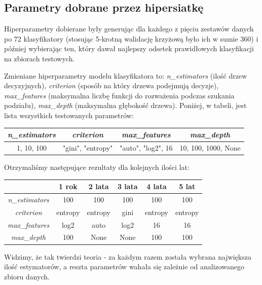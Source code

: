 \documentclass[11pt]{article}
\begin{document}
\subsection{Parametry dobrane przez hipersiatkę}
Hiperparametry dobierane były generując dla każdego z pięciu zestawów danych po 72 klasyfikatory (stosując 5-krotną walidację krzyżową było ich w sumie 360) i później wybierając ten, który dawał najlepszy odsetek prawidłowych klasyfikacji na zbiorach testowych.

Zmieniane hiperparametry modelu klasyfikatora to: \textsl{n\_estimators} (ilość drzew decyzyjnych), \textsl{criterion} (sposób na który drzewa podejmują decyzje), \textsl{max\_features} (maksymalna liczbę funkcji do rozważenia podczas szukania podziału), \textsl{max\_depth} (maksymalna głębokość drzewa). Poniżej, w tabeli, jest lista wszystkich testowanych parametrów:

\begin{center}
	\begin{tabular}{|c|c|c|c|}
		\hline
		\textit{n\_estimators}& \textit{criterion} & \textit{max\_features} & \textit{max\_depth}\\ \hline
		1, 10, 100 & "gini", "entropy" & "auto", "log2", 16 & 10, 100, 1000, None \\ \hline
	\end{tabular}
\end{center}

Otrzymaliśmy następujące rezultaty dla kolejnych ilości lat:

\begin{center}
	\begin{tabular}{|c|c|c|c|c|c|}
		\hline
		& \textbf{1 rok} & \textbf{2 lata} & \textbf{3 lata} & \textbf{4 lata} & \textbf{5 lat} \\ \hline
		\textit{n\_estimators} & 100 & 100 & 100 & 100 & 100 \\ \hline
		\textit{criterion} & entropy & entropy & gini & entropy & entropy \\ \hline
		\textit{max\_features} & log2 & auto & log2 & 16 & 16 \\ \hline
		\textit{max\_depth} & 100 & None & None & 100 & 100 \\ \hline
	\end{tabular}
\end{center}

Widzimy, że tak twierdzi teoria - za każdym razem została wybrana największa ilość estymatorów, a reszta parametrów wahała się zależnie od analizowanego zbioru danych. 
\end{document}
